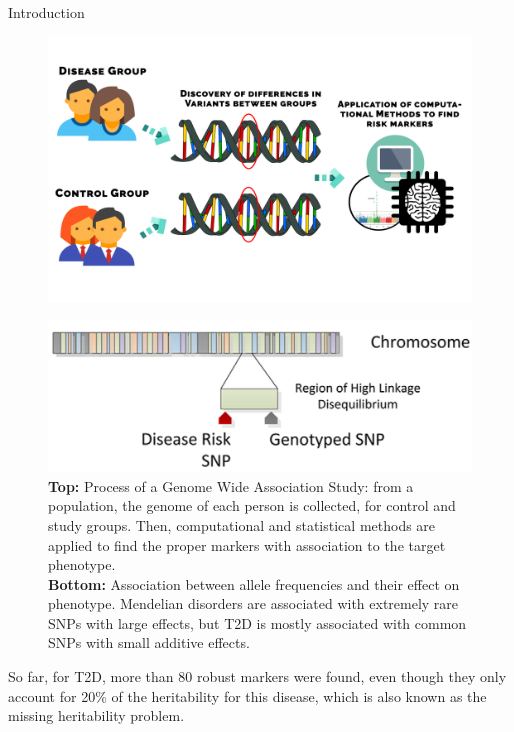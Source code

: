 \documentclass[final]{beamer}
\newlength{\onecolwid}
\begin{document}
\begin{frame}[t]
\begin{columns}[t]
\begin{column}{\onecolwid}
\begin{block}{Introduction}
\begin{figure}
   \includegraphics[width=1\linewidth]{gwas2v2.png}
 \end{figure}
          	\begin{figure}
  \includegraphics[width=1\linewidth]{LD.PNG}
                \caption{\textbf{Top:} Process of a Genome Wide Association Study: from a population, the genome of each person is collected, for control and study groups. Then, computational and statistical methods are applied to find the proper markers with association to the target phenotype.\\ \textbf{Bottom:} Association between allele frequencies and their effect on phenotype. Mendelian disorders are associated with extremely rare SNPs with large effects, but T2D is mostly associated with common SNPs with small additive effects\cite{bush2012genome}.}                
			\end{figure}  		  
          So far, for T2D, more than 80 robust markers were found, even though they only account for 20\% of the heritability for this disease, which is also known as the missing heritability problem\cite{fuchsberger2016genetic}.
          \end{block}
         \end{column}
         

\end{columns}
\end{frame}
\end{document}
